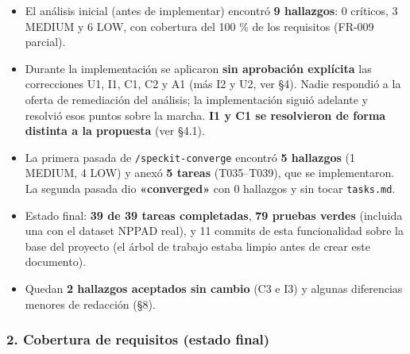 \documentclass[12pt,a4paper]{article}
\providecommand{\tightlist}{\setlength{\itemsep}{0pt}\setlength{\parskip}{0pt}}
\newenvironment{documentogenerado}[2]{%
  \def\doccomando{#1}\def\docruta{#2}%
  \par\begingroup\small\setstretch{1.15}\sloppy%
}{\endgroup\par\medskip}
\begin{document}
\begin{documentogenerado}{/speckit-analyze + /speckit-converge}{specs\slash 001-preparacion-datos\slash auditoria.md}
\begin{itemize}
\tightlist
\item
  El análisis inicial (antes de implementar) encontró \textbf{9 hallazgos}: 0 críticos, 3 MEDIUM y 6 LOW, con cobertura del 100 \% de los requisitos (FR-009 parcial).
\item
  Durante la implementación se aplicaron \textbf{sin aprobación explícita} las correcciones U1, I1, C1, C2 y A1 (más I2 y U2, ver §4). Nadie respondió a la oferta de remediación del análisis; la implementación siguió adelante y resolvió esos puntos sobre la marcha. \textbf{I1 y C1 se resolvieron de forma distinta a la propuesta} (ver §4.1).
\item
  La primera pasada de \texttt{/\allowbreak{}speckit-\allowbreak{}converge} encontró \textbf{5 hallazgos} (1 MEDIUM, 4 LOW) y anexó \textbf{5 tareas} (T035--T039), que se implementaron. La segunda pasada dio \textbf{«converged»} con 0 hallazgos y sin tocar \texttt{tasks.\allowbreak{}md}.
\item
  Estado final: \textbf{39 de 39 tareas completadas}, \textbf{79 pruebas verdes} (incluida una con el dataset NPPAD real), y 11 commits de esta funcionalidad sobre la base del proyecto (el árbol de trabajo estaba limpio antes de crear este documento).
\item
  Quedan \textbf{2 hallazgos aceptados sin cambio} (C3 e I3) y algunas diferencias menores de redacción (§8).
\end{itemize}

\subsubsection{2. Cobertura de requisitos (estado final)}


\end{documentogenerado}
\end{document}

